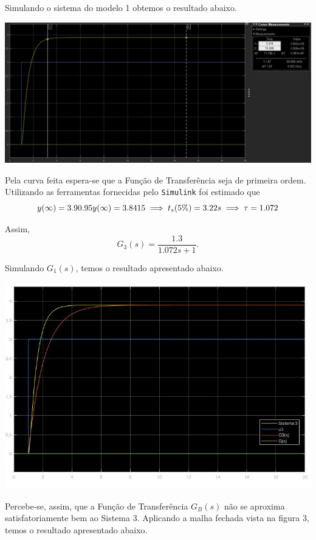 \documentclass[
]{book}
\theoremstyle{definition}
\theoremstyle{definition}
\theoremstyle{definition}
\theoremstyle{remark}
\begin{document}
Simulando o sistema do modelo 1 obtemos o resultado abaixo.

\includegraphics{Imagens/Lab3/Resolução/prob3AA.jpg}

Pela curva feita espera-se que a Função de Transferência seja de primeira ordem. Utilizando as ferramentas fornecidas pelo \texttt{Simulink} foi estimado que
\[
y(\infty) = 3.9 \\ 
0.95y(\infty) = 3.8415 \implies  t_s(5\%) = 3.22s \implies \tau = 1.072
\]

Assim,
\[
G_3(s) = \frac {1.3}{1.072s+1}.
\]

Simulando \(G_1(s)\), temos o resultado apresentado abaixo.

\includegraphics{Imagens/Lab3/Resolução/prob3AB.jpg}

Percebe-se, assim, que a Função de Transferência \(G_B(s)\) não se aproxima satisfatoriamente bem ao Sistema 3. Aplicando a malha fechada vista na figura 3, temos o resultado apresentado abaixo.
\end{document}
